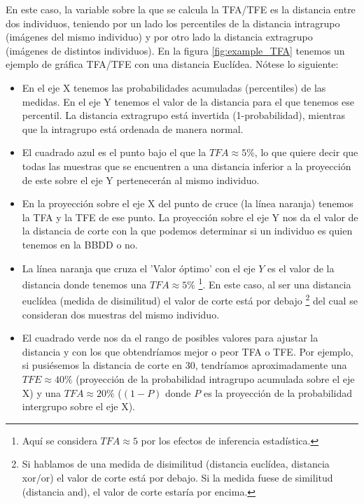 En este caso, la variable sobre la que se calcula la TFA/TFE es la distancia entre dos individuos, teniendo por un lado los percentiles de la distancia intragrupo (imágenes del mismo individuo) y por otro lado la distancia extragrupo (imágenes de distintos individuos). En la figura \ref{fig:example_TFA} tenemos un ejemplo de gráfica TFA/TFE con una distancia Euclídea. Nótese lo siguiente:
\begin{itemize}
	\item{En el eje X tenemos las probabilidades acumuladas (percentiles) de las medidas. En el eje Y tenemos el valor de la distancia para el que tenemos ese percentil. La distancia extragrupo está invertida (1-probabilidad), mientras que la intragrupo está ordenada de manera normal.}
	\item{El cuadrado azul es el punto bajo el que la $TFA\approx5\%$, lo que quiere decir que todas las muestras que se encuentren a una distancia inferior a la proyección de este sobre el eje Y pertenecerán al mismo individuo.}
	\item{En la proyección sobre el eje X del punto de cruce (la línea naranja) tenemos la TFA y la TFE de ese punto. La proyección sobre el eje Y nos da el valor de la distancia de corte con la que podemos determinar si un individuo es quien tenemos en la BBDD o no.}
	\item{La línea naranja que cruza el 'Valor óptimo' con el eje $Y$ es el valor de la distancia donde tenemos una $TFA\approx5\%$ \footnote{Aquí se considera $TFA\approx5$ por los efectos de inferencia estadística.}. En este caso, al ser una distancia euclídea (medida de disimilitud) el valor de corte está por debajo \footnote{Si hablamos de una medida de disimilitud (distancia euclídea, distancia xor/or) el valor de corte está por debajo. Si la medida fuese de similitud (distancia and), el valor de corte estaría por encima.} del cual se consideran dos muestras del mismo individuo. }
	\item{El cuadrado verde nos da el rango de posibles valores para ajustar la distancia y con los que obtendríamos mejor o peor TFA o TFE. Por ejemplo, si pusiésemos la distancia de corte en 30, tendríamos aproximadamente una $TFE\approx40\%$ (proyección de la probabilidad intragrupo acumulada sobre el eje X) y una $TFA\approx20\%$ ($(1-P)$ donde $P$ es la proyección de la probabilidad intergrupo sobre el eje X).} 
\end{itemize}

